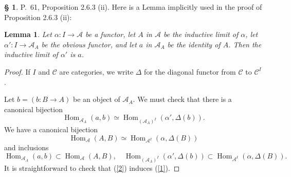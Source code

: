 \documentclass[12pt]{article}
\newtheorem{lem}[thm]{Lemma}
\theoremstyle{remark}
\theoremstyle{definition}
\newtheorem{s}[thm]{\S}
\newcommand{\A}{\mathcal A}
\newcommand{\C}{\mathcal C}
\DeclareMathOperator{\Hom}{Hom}
\begin{document}
\begin{s} 
P.~61, Proposition 2.6.3 (ii). Here is a Lemma implicitly used in the proof of Proposition 2.6.3 (ii): 

\begin{lem} 
Let $\alpha:I\to\A$ be a functor, let $A$ in $\A$ be the inductive limit of $\alpha$, let $\alpha':I\to\A_A$ be the obvious functor, and let $a$ in $\A_A$ be the identity of $A$. Then the inductive limit of $\alpha'$ is $a$. 
\end{lem} 

\begin{proof}
If $I$ and $\C$ are categories, we write $\Delta$ for the diagonal functor from $\C$ to $\C^I$. 

Let $b=(b:B\to A)$ be an object of $\A_A$. We must check that there is a canonical bijection
%
\begin{equation}\label{1}
\Hom_{\A_A}(a,b)\simeq\Hom_{(\A_A)^I}(\alpha',\Delta(b)).
\end{equation}
%
We have a canonical bijection
%
\begin{equation}\label{2}
\Hom_\A(A,B)\simeq\Hom_{\A^I}(\alpha,\Delta(B))
\end{equation}
%
and inclusions 
$$
\Hom_{\A_A}(a,b)\subset\Hom_\A(A,B),\quad
%
\Hom_{(\A_A)^I}(\alpha',\Delta(b))\subset\Hom_{\A^I}(\alpha,\Delta(B)).
$$
It is straightforward to check that (\ref{2}) induces (\ref{1}).
\end{proof}
\end{s}

%
\end{document}
